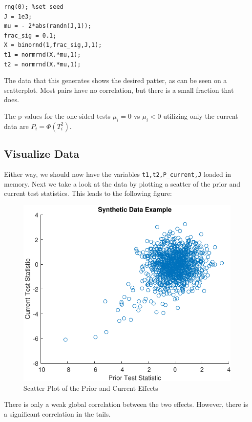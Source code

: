 \documentclass[english,11pt]{article} %
\begin{document}
\begin{verbatim}
rng(0); %set seed
J = 1e3;
mu = - 2*abs(randn(J,1));
frac_sig = 0.1;
X = binornd(1,frac_sig,J,1);
t1 = normrnd(X.*mu,1);
t2 = normrnd(X.*mu,1);
\end{verbatim}

The data that this generates shows the desired patter, as can be seen on a scatterplot. Most pairs have no correlation, but there is a small fraction that does.

The p-values for the one-sided tests $\mu_i = 0 $ vs $\mu_i <0$ utilizing only the current data are $P_i = \Phi(T^{2}_i)$.


\subsection{Visualize Data}

Either way, we should now have the variables \verb+t1,t2,P_current,J+ loaded in memory. Next we take a look at the data by plotting a scatter of the prior and current test statistics. This leads to the following figure:

\begin{figure}[ht!]
\centering
\includegraphics[scale=0.6]{"../Data/Synthetic_Data_example"}
\caption{Scatter Plot of the Prior and Current Effects}
\label{scatter_prior_current}
\end{figure}

There is only a weak global correlation between the two effects. However, there is a significant correlation in the tails. 
\end{document}
